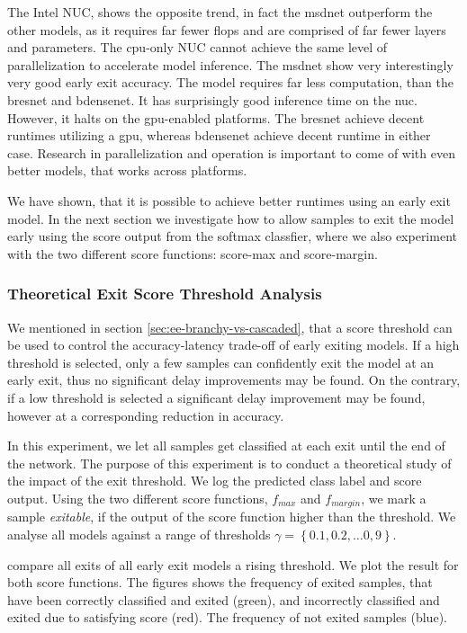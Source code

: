 The Intel NUC, shows the opposite trend, in fact the \gls{msdnet} outperform the other models, as it requires far fewer \gls{flop}s and are comprised of far fewer layers and parameters. The \gls{cpu}-only NUC cannot achieve the same level of parallelization to accelerate model inference. The \gls{msdnet} \cite{huang_multi-scale_2017} show very interestingly very good early exit accuracy. The model requires far less computation, than the \gls{bresnet} and \gls{bdensenet}. It has surprisingly good inference time on the \gls{nuc}. However, it halts on the \gls{gpu}-enabled platforms. The \gls{bresnet} achieve decent runtimes utilizing a \gls{gpu}, whereas \gls{bdensenet} achieve decent runtime in either case. Research in parallelization and operation is important to come of with even better models, that works across platforms.

We have shown, that it is possible to achieve better runtimes using an early exit model. In the next section we investigate how to allow samples to exit the model early using the score output from the softmax classfier, where we also experiment with the two different score functions: score-max and score-margin.

\subsubsection{Theoretical Exit Score Threshold Analysis}

We mentioned in section \ref{sec:ee-branchy-vs-cascaded}, that a score threshold can be used to control the accuracy-latency trade-off of early exiting models. If a high threshold is selected, only a few samples can confidently exit the model at an early exit, thus no significant delay improvements may be found. On the contrary, if a low threshold is selected a significant delay improvement may be found, however at a corresponding reduction in accuracy. 

In this experiment, we let all samples get classified at each exit until the end of the network. The purpose of this experiment is to conduct a theoretical study of the impact of the exit threshold. We log the predicted class label and score output. Using the two different score functions, $ f_{max} $ and $ f_{margin} $, we mark a sample \emph{exitable}, if the output of the score function higher than the threshold. We analyse all models against a range of thresholds $ \gamma = \left\{0.1, 0.2, \dots 0,9\right\} $.

 compare all exits of all early exit models a rising threshold. We plot the result for both score functions.
The figures shows the frequency of exited samples, that have been correctly classified and exited ({\color{sns-green}green}), and incorrectly classified and exited due to satisfying score ({\color{sns-red}red}). The frequency of not exited samples ({\color{sns-blue}blue}). 

